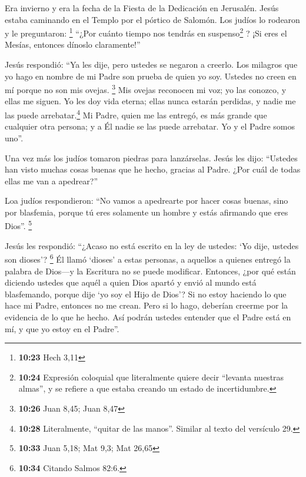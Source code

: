  Era invierno y era la fecha de la Fiesta de la
Dedicación en Jerusalén.  Jesús estaba caminando en el
Templo por el pórtico de Salomón. Los judíos lo rodearon y le
preguntaron: \footnote{\textbf{10:23} Hech 3,11}  ``¿Por
cuánto tiempo nos tendrás en suspenso\footnote{\textbf{10:24} Expresión
  coloquial que literalmente quiere decir ``levanta nuestras almas'', y
  se refiere a que estaba creando un estado de incertidumbre.} ? ¡Si
eres el Mesías, entonces dínoslo claramente!''

 Jesús respondió: ``Ya les dije, pero ustedes se negaron
a creerlo. Los milagros que yo hago en nombre de mi Padre son prueba de
quien yo soy.  Ustedes no creen en mí porque no son mis
ovejas. \footnote{\textbf{10:26} Juan 8,45; Juan 8,47} 
Mis ovejas reconocen mi voz; yo las conozco, y ellas me siguen.
 Yo les doy vida eterna; ellas nunca estarán perdidas, y
nadie me las puede arrebatar.\footnote{\textbf{10:28} Literalmente,
  ``quitar de las manos''. Similar al texto del versículo 29.}
 Mi Padre, quien me las entregó, es más grande que
cualquier otra persona; y a Él nadie se las puede arrebatar.
 Yo y el Padre somos uno''.

 Una vez más los judíos tomaron piedras para lanzárselas.
 Jesús les dijo: ``Ustedes han visto muchas cosas buenas
que he hecho, gracias al Padre. ¿Por cuál de todas ellas me van a
apedrear?''

 Loa judíos respondieron: ``No vamos a apedrearte por
hacer cosas buenas, sino por blasfemia, porque tú eres solamente un
hombre y estás afirmando que eres Dios''. \footnote{\textbf{10:33} Juan
  5,18; Mat 9,3; Mat 26,65}

 Jesús les respondió: ``¿Acaso no está escrito en la ley
de ustedes: `Yo dije, ustedes son dioses'? \footnote{\textbf{10:34}
  Citando Salmos 82:6.}  Él llamó `dioses' a estas
personas, a aquellos a quienes entregó la palabra de Dios---y la
Escritura no se puede modificar.  Entonces, ¿por qué
están diciendo ustedes que aquél a quien Dios apartó y envió al mundo
está blasfemando, porque dije `yo soy el Hijo de Dios'? 
Si no estoy haciendo lo que hace mi Padre, entonces no me crean.
 Pero si lo hago, deberían creerme por la evidencia de lo
que he hecho. Así podrán ustedes entender que el Padre está en mí, y que
yo estoy en el Padre''.

